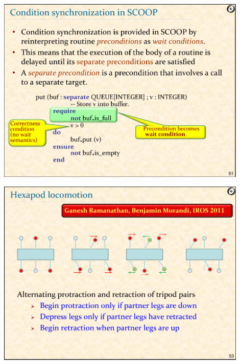 \documentclass[xetex,mathserif,serif]{beamer}
\begin{document}
	\begin{frame}
		\begin{center}
			\includegraphics[width=0.9\textwidth]{meyer8.png}
		\end{center}
	\end{frame}

	\begin{frame}
		\begin{center}
			\includegraphics[width=0.9\textwidth]{meyer9.png}
		\end{center}
	\end{frame}
\end{document}
